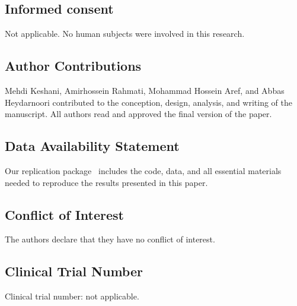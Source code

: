 \documentclass[smallextended]{svjour3}
\begin{document}
\subsection*{Informed consent}
Not applicable. No human subjects were involved in this research.

\subsection*{Author Contributions}
Mehdi Keshani, Amirhossein Rahmati, Mohammad Hossein Aref, and Abbas Heydarnoori contributed to the conception, design, analysis, and writing of the manuscript. All authors read and approved the final version of the paper.

\subsection*{Data Availability Statement}
Our replication package~\cite{repPackage} includes the code, data, and all essential materials needed to reproduce the results presented in this paper.

\subsection*{Conflict of Interest}
The authors declare that they have no conflict of interest.

\subsection*{Clinical Trial Number}
Clinical trial number: not applicable.




\end{document}
